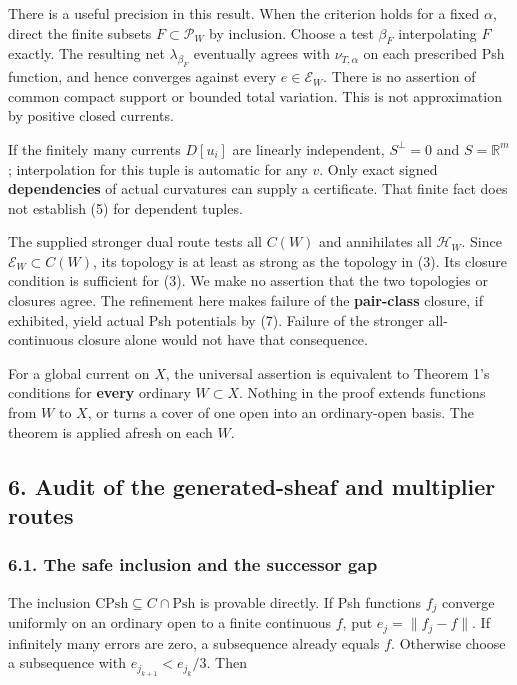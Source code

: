 \documentclass[
  11pt,
]{article}
\begin{document}
There is a useful precision in this result. When the criterion holds for
a fixed \(\alpha\), direct the finite subsets \(F\subset\mathcal P_W\)
by inclusion. Choose a test \(\beta_F\) interpolating \(F\) exactly. The
resulting net \(\lambda_{\beta_F}\) eventually agrees with
\(\nu_{T,\alpha}\) on each prescribed Psh function, and hence converges
against every \(e\in\mathcal E_W\). There is no assertion of common
compact support or bounded total variation. This is not approximation by
positive closed currents.

If the finitely many currents \(D[u_i]\) are linearly independent,
\(S^\perp=0\) and \(S=\mathbb R^m\); interpolation for this tuple is
automatic for any \(v\). Only exact signed \textbf{dependencies} of
actual curvatures can supply a certificate. That finite fact does not
establish (5) for dependent tuples.

The supplied stronger dual route tests all \(C(W)\) and annihilates all
\(\mathcal H_W\). Since \(\mathcal E_W\subset C(W)\), its topology is at
least as strong as the topology in (3). Its closure condition is
sufficient for (3). We make no assertion that the two topologies or
closures agree. The refinement here makes failure of the
\textbf{pair-class} closure, if exhibited, yield actual Psh potentials
by (7). Failure of the stronger all-continuous closure alone would not
have that consequence.

For a global current on \(X\), the universal assertion is equivalent to
Theorem 1's conditions for \textbf{every} ordinary \(W\subset X\).
Nothing in the proof extends functions from \(W\) to \(X\), or turns a
cover of one open into an ordinary-open basis. The theorem is applied
afresh on each \(W\).

\subsection{6. Audit of the generated-sheaf and multiplier
routes}\label{audit-of-the-generated-sheaf-and-multiplier-routes}

\subsubsection{6.1. The safe inclusion and the successor
gap}\label{the-safe-inclusion-and-the-successor-gap}

The inclusion \(\mathrm{CPsh}\subseteq C\cap\mathrm{Psh}\) is provable
directly. If Psh functions \(f_j\) converge uniformly on an ordinary
open to a finite continuous \(f\), put \(e_j=\|f_j-f\|\). If infinitely
many errors are zero, a subsequence already equals \(f\). Otherwise
choose a subsequence with \(e_{j_{k+1}}<e_{j_k}/3\). Then
\end{document}
